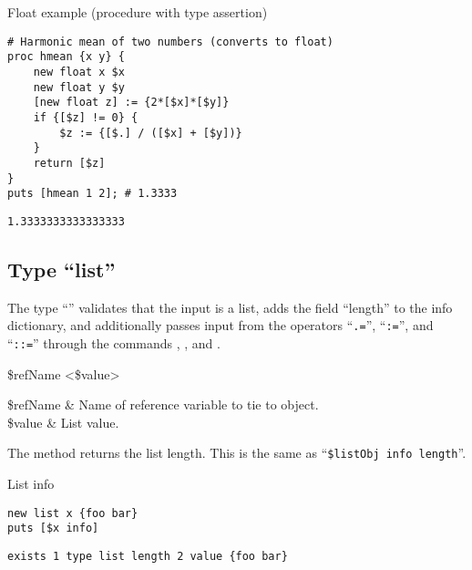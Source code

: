 \documentclass{article}
\begin{document}
\begin{example}{Float example (procedure with type assertion)}
\begin{lstlisting}
# Harmonic mean of two numbers (converts to float)
proc hmean {x y} {
    new float x $x
    new float y $y
    [new float z] := {2*[$x]*[$y]}
    if {[$z] != 0} {
        $z := {[$.] / ([$x] + [$y])}
    }
    return [$z]
}
puts [hmean 1 2]; # 1.3333
\end{lstlisting}
\tcblower
\begin{lstlisting}
1.3333333333333333
\end{lstlisting}
\end{example}

\clearpage
\subsection{Type ``list''}
The type ``'' validates that the input is a list, adds the field ``length'' to the info dictionary, and additionally passes input from the operators ``\texttt{.=}'', ``\texttt{:=}'', and ``\texttt{::=}'' through the commands , , and .
\begin{syntax}
 \$refName <\$value>
\end{syntax}
\begin{args}
\$refName & Name of reference variable to tie to object. \\
\$value & List value.
\end{args}
The method  returns the list length. This is the same as ``\texttt{\$listObj info length}''.
\begin{syntax}
\end{syntax}

\begin{example}{List info}
\begin{lstlisting}
new list x {foo bar}
puts [$x info]
\end{lstlisting}
\tcblower
\begin{lstlisting}
exists 1 type list length 2 value {foo bar}
\end{lstlisting}
\end{example}

\clearpage
\end{document}
